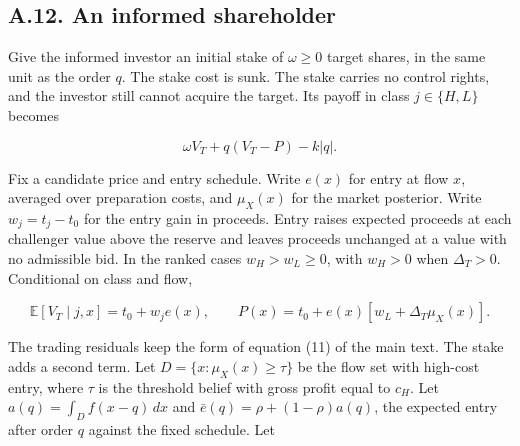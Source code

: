 
\subsection{A.12. An informed shareholder}\label{oa-a-stake}

Give the informed investor an initial stake of \(\omega\ge 0\) target
shares, in the same unit as the order \(q\). The stake cost is sunk.
The stake carries no control rights, and the investor still cannot
acquire the target. Its payoff in class \(j\in\{H,L\}\) becomes

\[
\omega V_T+q(V_T-P)-k|q|.
\]

Fix a candidate price and entry schedule. Write \(e(x)\) for entry
at flow \(x\), averaged over preparation costs, and \(\mu_X(x)\) for
the market posterior. Write \(w_j=t_j-t_0\) for the entry gain in
proceeds. Entry raises expected proceeds at each challenger value
above the reserve and leaves proceeds unchanged at a value with no
admissible bid. In the ranked cases \(w_H>w_L\ge 0\), with
\(w_H>0\) when \(\Delta_T>0\). Conditional on
class and flow,

\[
\mathbb E[V_T\mid j,x]=t_0+w_j e(x),\qquad
P(x)=t_0+e(x)[w_L+\Delta_T\mu_X(x)].
\]

The trading residuals keep the form of equation (11) of the main
text. The stake adds a second term. Let
\(D=\{x:\mu_X(x)\ge\tau\}\) be the flow set with high-cost entry,
where \(\tau\) is the threshold belief with gross profit equal to
\(c_H\). Let \(a(q)=\int_D f(x-q)\,dx\) and
\(\bar e(q)=\rho+(1-\rho)a(q)\), the expected entry after order
\(q\) against the fixed schedule. Let


